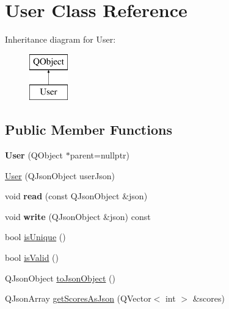 \hypertarget{classUser}{\section{User Class Reference}
\label{classUser}
}
Inheritance diagram for User\-:\begin{figure}[H]
\begin{center}
\leavevmode
\includegraphics[height=2.000000cm]{classUser}
\end{center}
\end{figure}
\subsection*{Public Member Functions}
\begin{DoxyCompactItemize}
\item 
\hypertarget{classUser_ae90821c4c8cc9a5a370f0ad6157adcc1}{{\bfseries User} (Q\-Object $\ast$parent=nullptr)}\label{classUser_ae90821c4c8cc9a5a370f0ad6157adcc1}

\item 
\hyperlink{classUser_a46c2dbdb8006a8752de309a81694a15b}{User} (Q\-Json\-Object user\-Json)
\item 
\hypertarget{classUser_ab12a51628183409d7ca7254fc67d7fbf}{void {\bfseries read} (const Q\-Json\-Object \&json)}\label{classUser_ab12a51628183409d7ca7254fc67d7fbf}

\item 
\hypertarget{classUser_a5a31456667d33c587e92aa0978612cac}{void {\bfseries write} (Q\-Json\-Object \&json) const }\label{classUser_a5a31456667d33c587e92aa0978612cac}

\item 
bool \hyperlink{classUser_a9e1fe4ac5c94a98f82ca09fa0982e029}{is\-Unique} ()
\item 
bool \hyperlink{classUser_a7fff50444765760051f4ae6fb3d58e16}{is\-Valid} ()
\item 
Q\-Json\-Object \hyperlink{classUser_aad36c436bfe69348e114fd922f9597ba}{to\-Json\-Object} ()
\item 
Q\-Json\-Array \hyperlink{classUser_a66d5ee177223841933f3907bf9a8362b}{get\-Scores\-As\-Json} (Q\-Vector$<$ int $>$ \&scores)
\end{DoxyCompactItemize}
